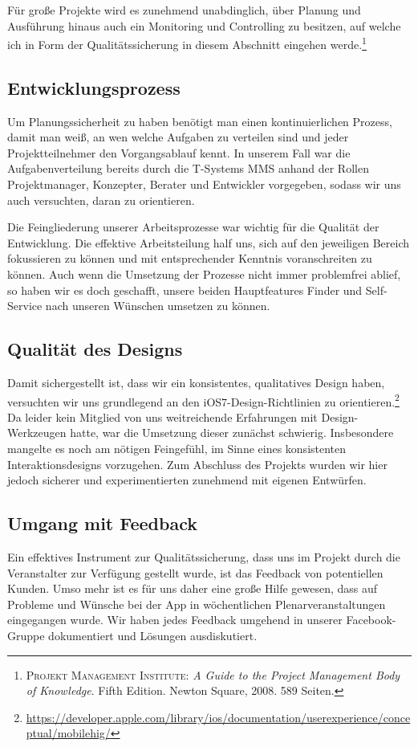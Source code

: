 	Für große Projekte wird es zunehmend unabdinglich, über Planung und Ausführung hinaus auch ein Monitoring und Controlling zu besitzen, auf welche ich in Form der Qualitätssicherung in diesem Abschnitt eingehen werde.\footnote{\textsc{Projekt Management Institute}: \textit{A Guide to the Project Management Body of Knowledge}. Fifth Edition. Newton Square, 2008. 589 Seiten.}

\subsection{Entwicklungsprozess}
	Um Planungssicherheit zu haben benötigt man einen kontinuierlichen Prozess, damit man weiß, an wen welche Aufgaben zu verteilen sind und jeder Projektteilnehmer den Vorgangsablauf kennt. In unserem Fall war die Aufgabenverteilung bereits durch die T-Systems MMS anhand der Rollen Projektmanager, Konzepter, Berater und Entwickler vorgegeben, sodass wir uns auch versuchten, daran zu orientieren. 
	
	Die Feingliederung unserer Arbeitsprozesse war wichtig für die Qualität der Entwicklung. Die effektive Arbeitsteilung half uns, sich auf den jeweiligen Bereich fokussieren zu können und mit entsprechender Kenntnis voranschreiten zu können. Auch wenn die Umsetzung der Prozesse nicht immer problemfrei ablief, so haben wir es doch geschafft, unsere beiden Hauptfeatures Finder und Self-Service nach unseren Wünschen umsetzen zu können.

\subsection{Qualität des Designs}
	Damit sichergestellt ist, dass wir ein konsistentes, qualitatives Design haben, versuchten wir uns grundlegend an den iOS7-Design-Richtlinien zu orientieren.\footnote{\url{https://developer.apple.com/library/ios/documentation/userexperience/conceptual/mobilehig/}} Da leider kein Mitglied von uns weitreichende Erfahrungen mit Design-Werkzeugen hatte, war die Umsetzung dieser zunächst schwierig. Insbesondere mangelte es noch am nötigen Feingefühl, im Sinne eines konsistenten Interaktionsdesigns vorzugehen. Zum Abschluss des Projekts wurden wir hier jedoch sicherer und experimentierten zunehmend mit eigenen Entwürfen.

\subsection{Umgang mit Feedback}
	Ein effektives Instrument zur Qualitätssicherung, dass uns im Projekt durch die Veranstalter zur Verfügung gestellt wurde, ist das Feedback von potentiellen Kunden. Umso mehr ist es für uns daher eine große Hilfe gewesen, dass auf Probleme und Wünsche bei der App in wöchentlichen Plenarveranstaltungen eingegangen wurde. Wir haben jedes Feedback umgehend in unserer Facebook-Gruppe dokumentiert und Lösungen ausdiskutiert.
	
